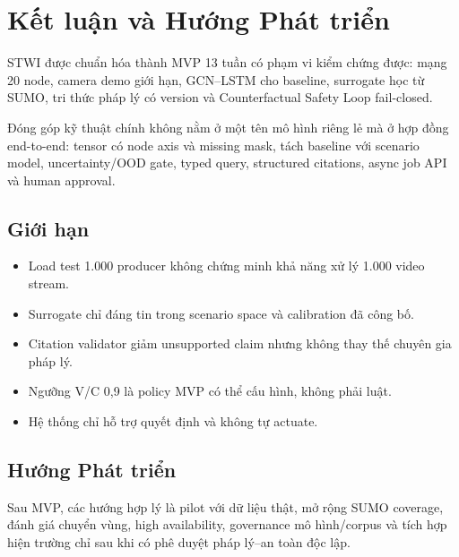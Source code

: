 \chapter{Kết luận và Hướng Phát triển}

STWI được chuẩn hóa thành MVP 13 tuần có phạm vi kiểm chứng được: mạng 20 node, camera demo giới hạn, GCN--LSTM cho baseline, surrogate học từ SUMO, tri thức pháp lý có version và Counterfactual Safety Loop fail-closed.

Đóng góp kỹ thuật chính không nằm ở một tên mô hình riêng lẻ mà ở hợp đồng end-to-end: tensor có node axis và missing mask, tách baseline với scenario model, uncertainty/OOD gate, typed query, structured citations, async job API và human approval.

\section{Giới hạn}

\begin{itemize}
  \item Load test 1.000 producer không chứng minh khả năng xử lý 1.000 video stream.
  \item Surrogate chỉ đáng tin trong scenario space và calibration đã công bố.
  \item Citation validator giảm unsupported claim nhưng không thay thế chuyên gia pháp lý.
  \item Ngưỡng V/C 0,9 là policy MVP có thể cấu hình, không phải luật.
  \item Hệ thống chỉ hỗ trợ quyết định và không tự actuate.
\end{itemize}

\section{Hướng Phát triển}

Sau MVP, các hướng hợp lý là pilot với dữ liệu thật, mở rộng SUMO coverage, đánh giá chuyển vùng, high availability, governance mô hình/corpus và tích hợp hiện trường chỉ sau khi có phê duyệt pháp lý--an toàn độc lập.
